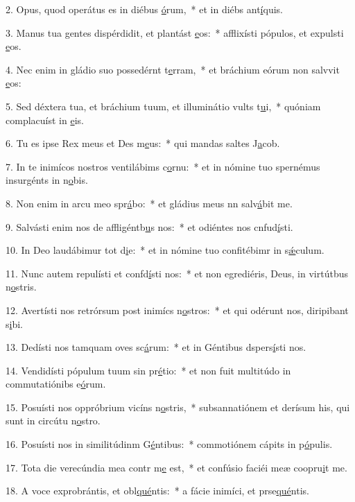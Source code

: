 2. Opus, quod operátus es in diébus \uline{ó}rum,~* et in diébs ant\uline{í}quis.\par 
3. Manus tua gentes dispérdidit, et plantást \uline{e}os:~* afflixísti pópulos, et expulsti \uline{e}os.\par 
4. Nec enim in gládio suo possedérnt t\uline{e}rram,~* et bráchium eórum non salvvit \uline{e}os:\par 
5. Sed déxtera tua, et bráchium tuum, et illuminátio vults t\uline{u}i,~* quóniam complacuíst in \uline{e}is.\par 
6. Tu es ipse Rex meus et Des m\uline{e}us:~* qui mandas saltes J\uline{a}cob.\par 
7. In te inimícos nostros ventilábims c\uline{o}rnu:~* et in nómine tuo spernémus insurgénts in n\uline{o}bis.\par 
8. Non enim in arcu meo spr\uline{á}bo:~* et gládius meus nn salv\uline{á}bit me.\par 
9. Salvásti enim nos de affligéntb\uline{u}s nos:~* et odiéntes nos cnfud\uline{í}sti.\par 
10. In Deo laudábimur tot d\uline{i}e:~* et in nómine tuo confitébimr in s\uline{ǽ}culum.\par 
11. Nunc autem repulísti et confd\uline{í}sti nos:~* et non egrediéris, Deus, in virtútbus n\uline{o}stris.\par 
12. Avertísti nos retrórsum post inimícs n\uline{o}stros:~* et qui odérunt nos, diripibant s\uline{i}bi.\par 
13. Dedísti nos tamquam oves sc\uline{á}rum:~* et in Géntibus dspers\uline{í}sti nos.\par 
14. Vendidísti pópulum tuum sin pr\uline{é}tio:~* et non fuit multitúdo in commutatiónibs e\uline{ó}rum.\par 
15. Posuísti nos oppróbrium vicíns n\uline{o}stris,~* subsannatiónem et derísum his, qui sunt in circútu n\uline{o}stro.\par 
16. Posuísti nos in similitúdinm G\uline{é}ntibus:~* commotiónem cápits in p\uline{ó}pulis.\par 
17. Tota die verecúndia mea contr m\uline{e} est,~* et confúsio faciéi meæ coopru\uline{i}t me.\par 
18. A voce exprobrántis, et obl\uline{qué}ntis:~* a fácie inimíci, et prse\uline{qué}ntis.\par 
